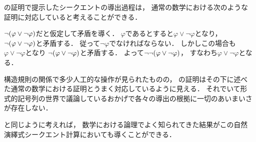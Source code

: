 の証明で提示したシークエントの導出過程は，
通常の数学における次のような証明に対応していると考えることができる．

\begin{naiveproof}
	\(\lnot \paren{\varphi \lor \lnot \varphi}\)だと仮定して矛盾を導く．
	\(\varphi\)であるとすると\(\varphi \lor \lnot \varphi\)となり，
	\(\lnot \paren{\varphi \lor \lnot \varphi}\)と矛盾する．
	従って\(\lnot \varphi\)でなければならない．
	しかしこの場合も\(\varphi \lor \lnot \varphi\)となり
	\(\lnot \paren{\varphi \lor \lnot \varphi}\)と矛盾する．
	よって\(\lnot \lnot \paren{\varphi \lor \lnot \varphi}\)，
	すなわち\(\varphi \lor \lnot \varphi\)となる．
\end{naiveproof}

構造規則の関係で多少人工的な操作が見られたものの，
の証明はその下に述べた通常の数学における証明とうまく対応しているように見える．
それでいて形式的記号列の世界で議論しているおかげで各々の導出の根拠に一切のあいまいさが存在しない．

と同じように考えれば，
数学における論理でよく知られてきた結果がこの自然演繹式シークエント計算においても導くことができる．

